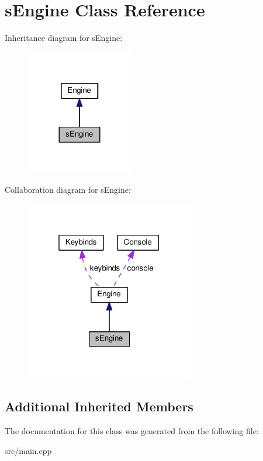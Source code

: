 \hypertarget{classsEngine}{}\section{s\+Engine Class Reference}
\label{classsEngine}


Inheritance diagram for s\+Engine\+:
\nopagebreak
\begin{figure}[H]
\begin{center}
\leavevmode
\includegraphics[width=132pt]{classsEngine__inherit__graph}
\end{center}
\end{figure}


Collaboration diagram for s\+Engine\+:
\nopagebreak
\begin{figure}[H]
\begin{center}
\leavevmode
\includegraphics[width=208pt]{classsEngine__coll__graph}
\end{center}
\end{figure}
\subsection*{Additional Inherited Members}


The documentation for this class was generated from the following file\+:\begin{DoxyCompactItemize}
\item 
src/main.\+cpp\end{DoxyCompactItemize}
